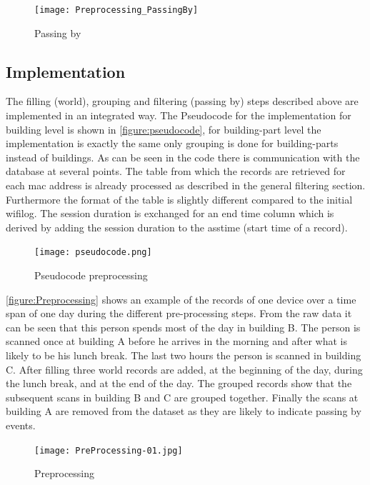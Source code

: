 \begin{figure}[H]
\centering
\texttt{[image: Preprocessing\_PassingBy]}
\captionsetup{justification=centering}
\caption{Passing by}
\label{figure:passing by}
\end{figure}

\subsection{Implementation}
The filling (world), grouping and filtering (passing by) steps described above are implemented in an integrated way. The Pseudocode for the implementation for building level is shown in \autoref{figure:pseudocode}, for building-part level the implementation is exactly the same only grouping is done for building-parts instead of buildings. As can be seen in the code there is communication with the database at several points. The table from which the records are retrieved for each mac address is already processed as described in the general filtering section. Furthermore the format of the table is slightly different compared to the initial wifilog. The session duration is exchanged for an end time column which is derived by adding the session duration to the asstime (start time of a record).

\begin{figure}[H]
\centering
\texttt{[image: pseudocode.png]}
\captionsetup{justification=centering}
\caption{Pseudocode preprocessing}
\label{figure:pseudocode}
\end{figure}

\autoref{figure:Preprocessing} shows an example of the records of one device over a time span of one day during the different pre-processing steps. From the raw data it can be seen that this person spends most of the day in building B. The person is scanned once at building A before he arrives in the morning and after what is likely to be his lunch break. The last two hours the person is scanned in building C. After filling three world records are added, at the beginning of the day, during the lunch break, and at the end of the day. The grouped records show that the subsequent scans in building B and C are grouped together. Finally the scans at building A are removed from the dataset as they are likely to indicate passing by events. 

\begin{figure}[H]
\centering
\texttt{[image: PreProcessing-01.jpg]}
\captionsetup{justification=centering}
\caption{Preprocessing}
\label{figure:Preprocessing}
\end{figure}

